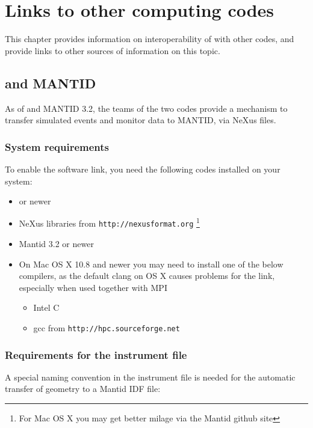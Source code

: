 \chapter{Links to other computing codes}

This chapter provides information on interoperability of \MCS with
other codes, and provide links to other sources of information on this topic.

\section{\MCS and MANTID}

As of  and MANTID 3.2, the teams of the two codes provide a mechanism to transfer simulated \MCS
events and monitor data to MANTID, via NeXus files.

\subsection{System requirements}
To enable the software link, you need the following codes installed on
your system:
\begin{itemize}
\item{ or newer}
\item{NeXus libraries from \verb+http://nexusformat.org+ \footnote{For Mac OS X you may get
    better milage via the Mantid github site}}
\item{Mantid 3.2 or newer}
\item{On Mac OS X 10.8 and newer you may need to install one of the
    below compilers, as the default clang on OS X causes problems for
    the link, especially when used together with MPI}
  \begin{itemize}
  \item{Intel C}
  \item{gcc from \verb+http://hpc.sourceforge.net+}
  \end{itemize}
\end{itemize}

\subsection{Requirements for the instrument file}
A special naming convention in the instrument file is needed for the
automatic transfer of geometry to a Mantid IDF file:


